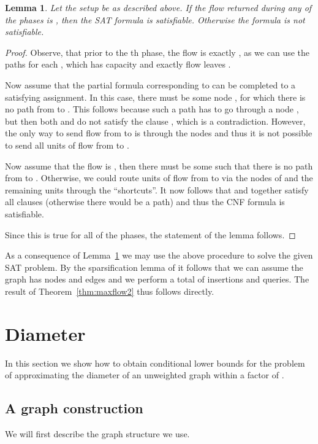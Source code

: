 \documentclass[a4paper,11pt]{article}
\newtheorem{lemma}{Lemma}
\theoremstyle{definition}
\begin{document}
\begin{lemma}\label{lem:maxflow_correct}
    Let the setup be as described above. If the  flow returned during any
    of the  phases is , then the SAT formula is satisfiable.
    Otherwise the formula is not satisfiable.
\end{lemma}
\begin{proof}
    Observe, that prior to the th phase, the flow is exactly ,
    as we can use the paths  for each , which has
    capacity  and exactly  flow leaves .

    Now assume that the partial formula corresponding to  can be completed
    to a satisfying assignment. In this case, there must be some node ,
    for which there is no path from  to . This follows because such a
    path has to go through a node , but then both  and  do not
    satisfy the clause , which is a contradiction. However, the only way to
    send flow from  to  is through the nodes  and thus it is
    not possible to send all  units of flow from  to .

    Now assume that the flow is , then there must be
    some  such that there is no path from  to . Otherwise, we
    could route  units of flow from  to  via the nodes of  and
    the remaining  units through the ``shortcuts''. It now
    follows that  and  together satisfy all clauses (otherwise there
    would be a path) and thus the CNF formula is satisfiable.

    Since this is true for all of the  phases, the statement of the lemma
    follows.
\end{proof}

As a consequence of Lemma~\ref{lem:maxflow_correct} we may use the above
procedure to solve the given SAT problem. By the sparsification lemma of
\cite{ImpagliazzoPZ01} it follows that we can assume the graph has  nodes
and  edges and we perform a total of  insertions and queries.
The result of Theorem~\ref{thm:maxflow2} thus follows directly.


\section{Diameter}
In this section we show how to obtain conditional lower bounds for the problem
of approximating the diameter of an unweighted graph within a factor of
.

\subsection{A graph construction}
We will first describe the graph structure we use.
\end{document}
